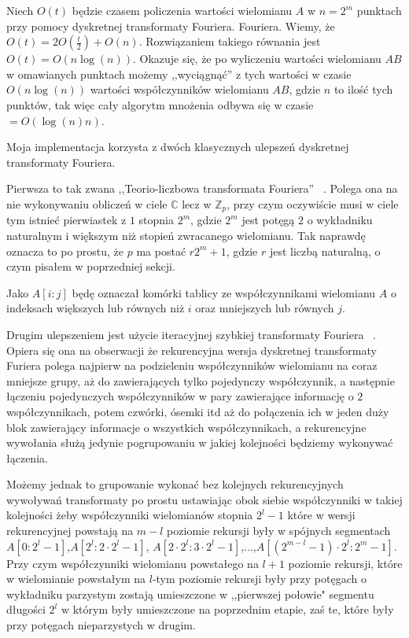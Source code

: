 \documentclass{article}
\begin{document}
Niech $O(t)$ będzie czasem policzenia wartości wielomianu $A$ w $n=2^m$ punktach przy pomocy dyskretnej transformaty Fouriera. 
Fouriera. Wiemy, że $O(t)=2O(\frac{t}{2})+O(n)$. Rozwiązaniem takiego równania jest $O(t)=O(n\log(n))$.
Okazuje się, że po wyliczeniu wartości wielomianu $AB$ w omawianych punktach możemy ,,wyciągnąć'' z tych wartości w czasie
$O(n\log(n))$ wartości współczynników wielomianu $AB$, gdzie $n$ to ilość tych punktów, tak więc cały algorytm mnożenia odbywa się w czasie $=O(\log(n)n)$.

Moja implementacja korzysta z dwóch klasycznych ulepszeń dyskretnej transformaty Fouriera. 

Pierwsza to tak zwana ,,Teorio-liczbowa transformata Fouriera'' ~\cite{garg2017digital}. Polega ona na nie wykonywaniu obliczeń w ciele $\mathbb{C}$ lecz
w $\mathbb{Z}_p$, przy czym oczywiście musi w ciele tym istnieć pierwiastek z $1$ stopnia $2^m$, gdzie $2^m$ jest potęgą $2$ o wykładniku
naturalnym i większym niż stopień zwracanego wielomianu. 
Tak naprawdę oznacza to po prostu, że $p$ ma postać $r2^m+1$, gdzie $r$ jest liczbą naturalną, o czym pisałem w poprzedniej 
sekcji.

Jako $A[i:j]$ będę oznaczał komórki tablicy ze współczynnikami wielomianu $A$ o indeksach większych lub równych niż $i$ oraz mniejszych lub równych $j$. 


Drugim ulepszeniem jest użycie iteracyjnej szybkiej transformaty Fouriera ~\cite{wyrowski1988iterative}. Opiera się ona na obserwacji że rekurencyjna wersja dyskretnej transformaty Furiera 
polega najpierw na podzieleniu współczynników wielomianu na coraz mniejsze grupy, aż do zawierających tylko pojedynczy współczynnik, a następnie łączeniu pojedynczych współczynników
w pary zawierające informację o $2$ współczynnikach, potem czwórki, ósemki itd aż do połączenia ich w jeden duży blok zawierający informacje o wszystkich współczynnikach, a rekurencyjne wywołania służą jedynie 
pogrupowaniu w jakiej kolejności będziemy wykonywać łączenia.


Możemy jednak to grupowanie wykonać bez kolejnych rekurencyjnych wywoływań transformaty po prostu ustawiając obok siebie współczynniki w takiej kolejności 
żeby współczynniki wielomianów stopnia $2^l-1$ które w wersji rekurencyjnej powstają na $m-l$ poziomie rekursji
były w spójnych segmentach $A[0:2^l-1]$,$A[2^l:2 \cdot 2^l-1]$,
$A[2 \cdot 2^l:3\cdot 2^l-1]$,...,$A[(2^{m-l}-1)\cdot 2^l:2^m-1]$. Przy czym współczynniki wielomianu powstałego na
$l+1$ poziomie rekursji, które w wielomianie powstałym na $l$-tym poziomie rekursji były przy 
potęgach o wykładniku parzystym zostają umieszczone w ,,pierwszej połowie" segmentu 
długości $2^l$ w którym były umieszczone na poprzednim etapie, zaś te, które były przy 
potęgach nieparzystych w drugim.
\end{document}
